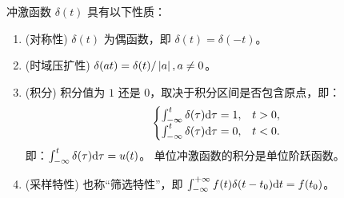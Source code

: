 \begin{property}[冲激函数的性质总结]
    冲激函数 $\delta(t)$ 具有以下性质：
    \begin{enumerate}
        \item (对称性) $\delta(t)$ 为偶函数，即 $\delta(t) = \delta(-t)$。
        \item (时域压扩性) $\delta(at) = \delta(t) / \left|a\right|, a \neq 0$。
        \item (积分) 积分值为 $1$ 还是 $0$，取决于积分区间是否包含原点，即：
            \begin{align*}
                \begin{cases}
                    \int_{-\infty}^{t}\delta(\tau)\mathrm{d}\tau = 1, & t > 0, \\
                    \int_{-\infty}^{t}\delta(\tau)\mathrm{d}\tau = 0, & t < 0.
                \end{cases}
            \end{align*}
            即：$\int_{-\infty}^{t}\delta(\tau)\mathrm{d}\tau = u(t)$。
            单位冲激函数的积分是单位阶跃函数。
        \item (采样特性) 也称``筛选特性''，即 $\int_{-\infty}^{+\infty}f(t)\delta(t - t_0)\mathrm{d}t = f(t_0)$。
    \end{enumerate}
\end{property}

